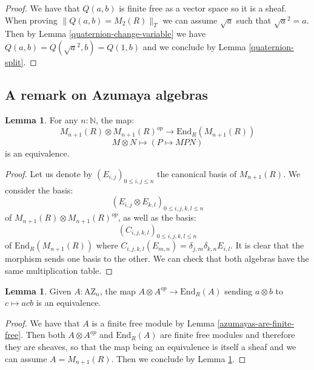 \documentclass[10pt,a4paper]{article}
\theoremstyle{definition}
\newtheorem{lemma}[theorem]{Lemma}
\newcommand{\AZ}{\mathrm{AZ}}
\newcommand{\propTrunc}[1]{\lVert #1 \rVert}
\newcommand{\N}{\mathbb{N}}
\begin{document}
\begin{proof}
We have that $Q(a,b)$ is finite free as a vector space so it is a sheaf. When proving $\propTrunc{Q(a,b)=M_2(R)}_T$ we can assume $\sqrt{a}$ such that $\sqrt{a}^2 = a$. Then by Lemma \ref{quaternion-change-variable} we have $Q(a,b) = Q(\sqrt{a}^2,b) = Q(1,b)$ and we conclude by Lemma \ref{quaternion-split}.
\end{proof}


\subsection{A remark on Azumaya algebras}

\begin{lemma}\label{MnR-endomorphism-multiplication}
For any $n:\N$, the map:
\[M_{n+1}(R)\otimes M_{n+1}(R)^{op}\to \mathrm{End}_R(M_{n+1}(R))\]
\[M\otimes N\mapsto (P\mapsto MPN)\]
is an equivalence.
\end{lemma}

\begin{proof}
Let us denote by $(E_{i,j})_{0\leq i,j\leq n}$ the canonical basis of $M_{n+1}(R)$. We consider the basis: 
\[(E_{i,j}\otimes E_{k,l})_{0\leq i,j,k,l\leq n}\] 
of $M_{n+1}(R)\otimes M_{n+1}(R)^{op}$, as well as the basis:
\[(C_{i,j,k,l})_{0\leq i,j,k,l\leq n}\] 
of $\mathrm{End}_R(M_{n+1}(R))$ where $C_{i,j,k,l}(E_{m,n}) = \delta_{j,m}\delta_{k,n} E_{i,l}$. It is clear that the morphism sends one basis to the other. We can check that both algebras have the same multiplication table. %
\end{proof}

\begin{lemma}
Given $A:\AZ_n$, the map $A\otimes A^{op}\to \mathrm{End}_R(A)$ sending $a\otimes b$ to $c\mapsto acb$ is an equivalence.
\end{lemma}

\begin{proof}
We have that $A$ is a finite free module by Lemma \ref{azumayas-are-finite-free}. Then both $A\otimes A^{op}$ and $\mathrm{End}_R(A)$ are finite free modules and therefore they are sheaves, so that the map being an equivalence is itself a sheaf and we can assume $A=M_{n+1}(R)$. Then we conclude by Lemma \ref{MnR-endomorphism-multiplication}.
\end{proof}
\end{document}
